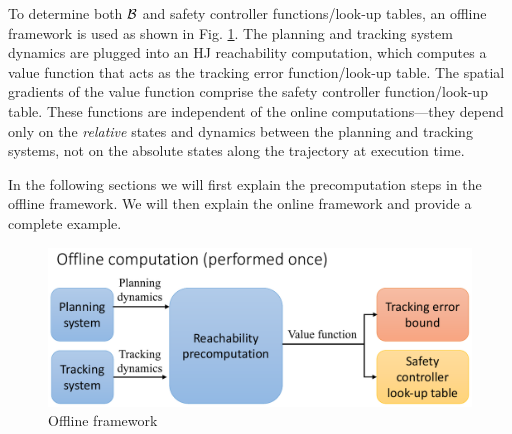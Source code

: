 To determine both $\mathcal B$ and safety controller functions/look-up tables, an offline framework is used as shown in Fig. \ref{fig:fw_offline}. The planning and tracking system dynamics are plugged into an HJ reachability computation, which computes a value function that acts as the tracking error function/look-up table. The spatial gradients of the value function comprise the safety controller function/look-up table. These functions are independent of the online computations---they depend only on the \textit{relative} states and dynamics between the planning and tracking systems, not on the absolute states along the trajectory at execution time.

In the following sections we will first explain the precomputation steps in the offline framework. We will then explain the online framework and provide a complete example.
\begin{figure}[]
  \centering
	\includegraphics[width=0.9\columnwidth]{fig/framework_offline}
	\caption{Offline framework}
	\label{fig:fw_offline}
\end{figure}

